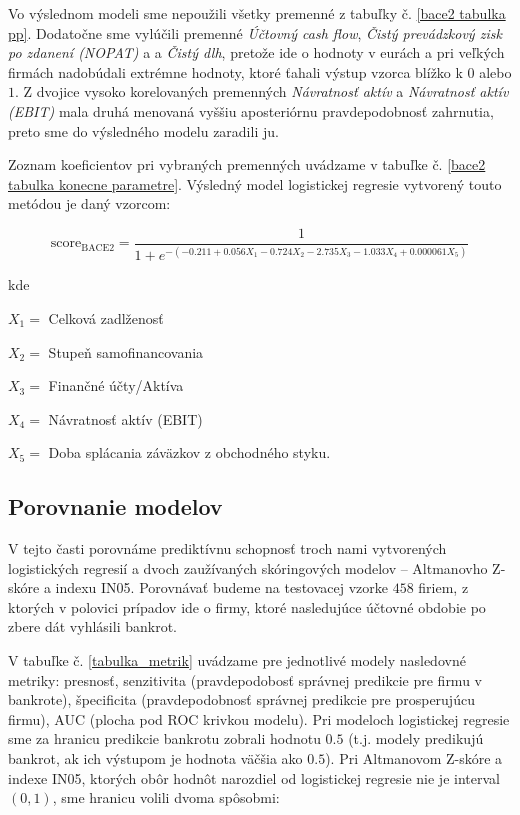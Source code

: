 Vo výslednom modeli sme nepoužili všetky premenné z tabuľky č. \ref{bace2 tabulka pp}.
Dodatočne sme vylúčili premenné \emph{Účtovný cash flow}, \emph{Čistý prevádzkový zisk po zdanení (NOPAT)} a a \emph{Čistý dlh},
pretože ide o hodnoty v eurách a pri veľkých firmách nadobúdali extrémne hodnoty, ktoré ťahali výstup vzorca blížko k \(0\) alebo \(1\).
Z dvojice vysoko korelovaných premenných \emph{Návratnosť aktív} a \emph{Návratnosť aktív (EBIT)} mala druhá menovaná vyššiu aposteriórnu pravdepodobnosť zahrnutia,
preto sme do výsledného modelu zaradili ju.

Zoznam koeficientov pri vybraných premenných uvádzame v tabuľke č. \ref{bace2 tabulka konecne parametre}.
Výsledný model logistickej regresie vytvorený touto metódou je daný vzorcom:

\[
    \text{score}_\text{BACE2} = \frac{1}{1 + e^{-(-0.211 + 0.056X_1 - 0.724X_2 - 2.735X_3 - 1.033X_4 + 0.000061X_5)}}
\]

kde

\(X_1 = \) Celková zadlženosť

\(X_2 = \) Stupeň samofinancovania

\(X_3 = \) Finančné účty/Aktíva

\(X_4 = \) Návratnosť aktív (EBIT)

\(X_5 = \) Doba splácania záväzkov z obchodného styku.


\subsection{Porovnanie modelov}

V tejto časti porovnáme prediktívnu schopnosť troch nami vytvorených logistických regresií a dvoch zaužívaných skóringových modelov – Altmanovho Z-skóre a indexu IN05.
Porovnávať budeme na testovacej vzorke \(458\) firiem, z ktorých v polovici prípadov ide o firmy, ktoré nasledujúce účtovné obdobie po zbere dát vyhlásili bankrot.

V tabuľke č. \ref{tabulka_metrik} uvádzame pre jednotlivé modely nasledovné metriky:
presnosť, senzitivita (pravdepodobosť správnej predikcie pre firmu v bankrote), špecificita (pravdepodobnosť správnej predikcie pre prosperujúcu firmu), AUC (plocha pod ROC krivkou modelu).
Pri modeloch logistickej regresie sme za hranicu predikcie bankrotu zobrali hodnotu \(0.5\) (t.j. modely predikujú bankrot, ak ich výstupom je hodnota väčšia ako \(0.5\)).
Pri Altmanovom Z-skóre a indexe IN05, ktorých obôr hodnôt narozdiel od logistickej regresie nie je interval \((0, 1)\), sme hranicu volili dvoma spôsobmi:


